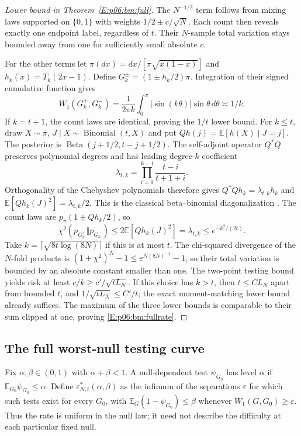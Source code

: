 \documentclass[11pt,a4paper]{article}
\theoremstyle{definition}
\theoremstyle{remark}
\numberwithin{equation}{section}
\begin{document}
\begin{proof}[Lower bound in Theorem~\ref{E:p06:bm:full}]
The $N^{-1/2}$ term follows from mixing laws supported on $\{0,1\}$ with
weights $1/2\pm c/\sqrt N$. Each count then reveals exactly one endpoint
label, regardless of $t$. Their $N$-sample total variation stays bounded
away from one for sufficiently small absolute $c$.

For the other terms let $\pi(dx)=dx/[\pi\sqrt{x(1-x)}]$ and
$h_k(x)=T_k(2x-1)$. Define
$G_k^\pm=(1\pm h_k/2)\pi$. Integration of their signed cumulative
function gives
\[
 W_1(G_k^+,G_k^-)
  =\frac1{2\pi k}\int_0^\pi|\sin(k\theta)|\sin\theta\,d\theta
  \asymp1/k.
\]
If $k=t+1$, the count laws are identical, proving the $1/t$ lower bound.
For $k\le t$, draw $X\sim\pi$, $J\mid X\sim\operatorname{Binomial}(t,X)$
and put $Qh(j)=\mathbb E[h(X)\mid J=j]$. The posterior is
$\operatorname{Beta}(j+1/2,t-j+1/2)$. The self-adjoint operator $Q^*Q$
preserves polynomial degrees and has leading degree-$k$ coefficient
\[
 \lambda_{t,k}=\prod_{i=0}^{k-1}\frac{t-i}{t+1+i}.
\]
Orthogonality of the Chebyshev polynomials therefore gives
$Q^*Qh_k=\lambda_{t,k}h_k$ and
$\mathbb E[Qh_k(J)^2]=\lambda_{t,k}/2$.
This is the classical beta--binomial diagonalization
\cite[Section~4.1]{BT_DKS2008}.
The count laws are $p_\pi(1\pm Qh_k/2)$, so
\[
 \chi^2(p_{G_k^+}\Vert p_{G_k^-})
 \le2\mathbb E[Qh_k(J)^2]=\lambda_{t,k}
 \le e^{-k^2/(2t)}.
\]
Take $k=\lceil\sqrt{8t\log(8N)}\rceil$ if this is at most $t$.
The chi-squared divergence of the $N$-fold products is
$(1+\chi^2)^N-1\le e^{N(8N)^{-4}}-1$, so their total variation is
bounded by an absolute constant smaller than one. The two-point testing
bound yields risk at least $c/k\ge c'/\sqrt{tL_N}$.
If this choice has $k>t$, then $t\le C L_N$ apart from bounded $t$,
and $1/\sqrt{tL_N}\le C'/t$; the exact moment-matching lower bound
already suffices. The maximum of the three lower bounds is comparable
to their sum clipped at one, proving \eqref{E:p06:bm:fullrate}.
\end{proof}


\subsection{The full worst-null testing curve}

Fix $\alpha,\beta\in(0,1)$ with $\alpha+\beta<1$. A null-dependent test
$\psi_{G_0}$ has level $\alpha$ if
$\mathbb E_{G_0}\psi_{G_0}\le\alpha$. Define
$\varepsilon^*_{N,t}(\alpha,\beta)$ as the infimum of the separations
$\varepsilon$ for which such tests exist for every $G_0$, with
$\mathbb E_G(1-\psi_{G_0})\le\beta$ whenever
$W_1(G,G_0)\ge\varepsilon$. Thus the rate is uniform in the null law;
it need not describe the difficulty at each particular fixed null.
\end{document}
